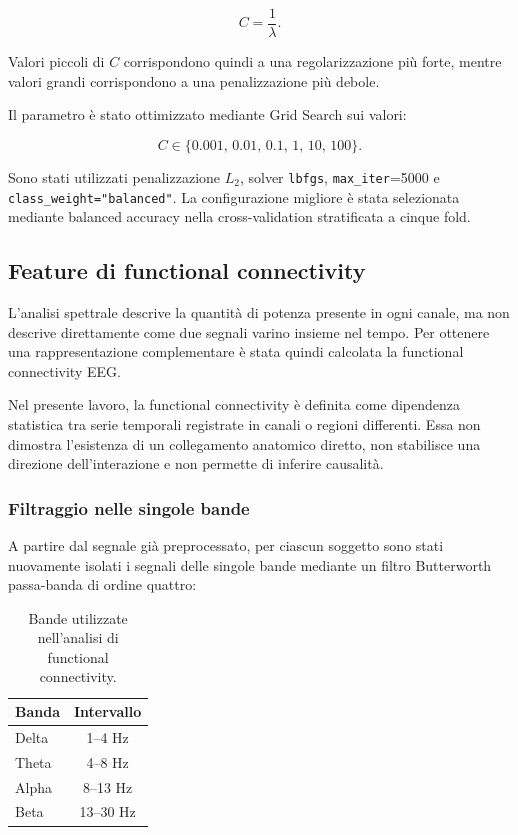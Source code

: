 \begin{equation}
	C
	=
	\frac{1}{\lambda}.
\end{equation}

Valori piccoli di $C$ corrispondono quindi a una regolarizzazione più
forte, mentre valori grandi corrispondono a una penalizzazione più
debole.

Il parametro è stato ottimizzato mediante Grid Search sui valori:

\begin{equation}
	C
	\in
	\{
	0.001,\,
	0.01,\,
	0.1,\,
	1,\,
	10,\,
	100
	\}.
\end{equation}

Sono stati utilizzati penalizzazione $L_2$, solver
\texttt{lbfgs}, \texttt{max\_iter}=5000 e
\texttt{class\_weight="balanced"}. La configurazione migliore è stata
selezionata mediante balanced accuracy nella cross-validation
stratificata a cinque fold.


\subsection{Feature di functional connectivity}

L'analisi spettrale descrive la quantità di potenza presente in ogni
canale, ma non descrive direttamente come due segnali varino insieme
nel tempo. Per ottenere una rappresentazione complementare è stata
quindi calcolata la functional connectivity EEG.

Nel presente lavoro, la functional connectivity è definita come
dipendenza statistica tra serie temporali registrate in canali o
regioni differenti. Essa non dimostra l'esistenza di un collegamento
anatomico diretto, non stabilisce una direzione dell'interazione e non
permette di inferire causalità.


\subsubsection{Filtraggio nelle singole bande}

A partire dal segnale già preprocessato, per ciascun soggetto sono
stati nuovamente isolati i segnali delle singole bande mediante un
filtro Butterworth passa-banda di ordine quattro:

\begin{table}[H]
	\centering
	\begin{tabular}{lc}
		\hline
		\textbf{Banda} & \textbf{Intervallo} \\
		\hline
		Delta & 1--4 Hz \\
		Theta & 4--8 Hz \\
		Alpha & 8--13 Hz \\
		Beta & 13--30 Hz \\
		\hline
	\end{tabular}
	\caption{Bande utilizzate nell'analisi di functional
		connectivity.}
	\label{tab:connectivity_bands}
\end{table}

